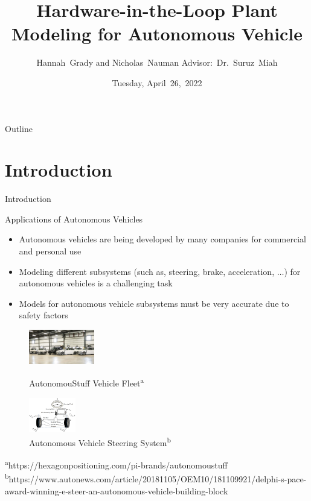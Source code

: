 \documentclass{beamer}
\title[HIL Plant Modeling]{Hardware-in-the-Loop Plant Modeling for Autonomous Vehicle}
\author[H.~Grady, N.~Nauman]{Hannah~Grady and Nicholas~Nauman 
\linebreak Advisor:~Dr.~Suruz~Miah}
\institute[Bradley University] %
{
  \inst{~}Department of Electrical and Computer Engineering\\
  Bradley University\\
  1501 W. Bradley Avenue\\
  Peoria, IL, 61625, USA
  \and
  \inst{~}\textbf{Sponsor:}~AutonomouStuff $|$~https://autonomoustuff.com/\\
  306 Erie Avenue, Morton, IL 61550\\
  Telephone:~309-291-0966, email:info.as.ap@hexagon.com
}
\date[April~26,~2022]{Tuesday, April~26,~2022}
\begin{document}
\begin{frame}
  \titlepage
\end{frame}

\begin{frame}{Outline} 
  \tableofcontents%
\end{frame}

\section{Introduction}

\begin{frame}{Introduction}{}
	\begin{block}{Applications of Autonomous Vehicles}
    	\begin{itemize}
    		\item Autonomous vehicles are being developed by many companies for commercial and personal use
    		\item Modeling different subsystems (such as, steering, brake,
          acceleration, $\ldots$)  for autonomous vehicles is a challenging task
     		\item Models for autonomous vehicle subsystems must be very accurate due to safety factors
		\end{itemize}
    \end{block}
        \begin{figure}
			\centering
			\begin{minipage}[t]{0.4\textwidth}
				\centering
				\includegraphics[height=1.5cm]{figs/img/autonomousVehiclesAStuff}
				\caption{AutonomouStuff Vehicle Fleet\textsuperscript{a}}
				\label{fig:fleet}
			\end{minipage}
			\begin{minipage}[t]{0.4\textwidth}
				\centering
				\includegraphics[height=1.5cm]{figs/img/autonomousVehiclesSteering}
				\caption{Autonomous Vehicle Steering System\textsuperscript{b}}
				\label{fig:steerSystem}
			\end{minipage}
        \end{figure}
    \begin{tiny}
		\textsuperscript{a}https://hexagonpositioning.com/pi-brands/autonomoustuff\\\textsuperscript{b}https://www.autonews.com/article/20181105/OEM10/181109921/delphi-s-pace-award-winning-e-steer-an-autonomous-vehicle-building-block
    \end{tiny}
\end{frame}
\end{document}
